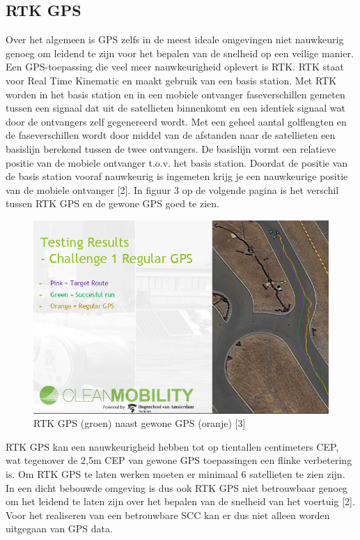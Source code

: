 \documentclass[a4paper, 11pt]{article} %
\begin{document}
\subsection{RTK GPS}
Over het algemeen is GPS zelfs in de meest ideale omgevingen niet nauwkeurig genoeg om leidend te zijn voor het bepalen van de snelheid op een veilige manier. Een GPS-toepassing die veel meer nauwkeurigheid oplevert is RTK. RTK staat voor Real Time Kinematic en maakt gebruik van een basis station. Met RTK worden in het basis station en in een mobiele ontvanger faseverschillen gemeten tussen een signaal dat uit de satellieten binnenkomt en een identiek signaal wat door de ontvangers zelf gegenereerd wordt. Met een geheel aantal golflengten en de faseverschillen wordt door middel van de afstanden naar de satellieten een basislijn berekend tussen de twee ontvangers. De basislijn vormt een relatieve positie van de mobiele ontvanger t.o.v. het basis station. Doordat de positie van de basis station vooraf nauwkeurig is ingemeten krijg je een nauwkeurige positie van de mobiele ontvanger [2]. In figuur 3 op de volgende pagina is het verschil tussen RTK GPS en de gewone GPS goed te zien.
\newpage
\begin{figure}[h!]
	\centering
	\includegraphics[width=12cm]{afbeeldingen/RTKvsNorm.PNG}
	\caption{RTK GPS (groen) naast gewone GPS (oranje) [3]}
\end{figure}
RTK GPS kan een nauwkeurigheid hebben tot op tientallen centimeters CEP, wat tegenover de 2,5m CEP van gewone GPS toepassingen een flinke verbetering is. Om RTK GPS te laten werken moeten er minimaal 6 satellieten te zien zijn. In een dicht bebouwde omgeving is dus ook RTK GPS niet betrouwbaar genoeg om het leidend te laten zijn over het bepalen van de snelheid van het voertuig [2]. Voor het realiseren van een betrouwbare SCC kan er dus niet alleen worden uitgegaan van GPS data.
\end{document}
